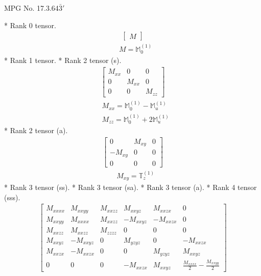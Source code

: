 \documentclass[fleqn,8pt,landscape]{jsarticle}
\begin{document}
\setcounter{MaxMatrixCols}{32}

\renewcommand{\tablename}{Table~}
\renewcommand{\figurename}{Figure~}
\begin{center}
\LARGE
MPG No. 17.3.64\quad$\bar{3}'$
\end{center}
* Rank 0 tensor.
\begin{align*}
\begin{bmatrix} M \end{bmatrix}
\end{align*}
\begin{align*}
& M = \mathbb{M}_{0}^{(1)}
\end{align*}
* Rank 1 tensor.
* Rank 2 tensor (s).
\begin{align*}
\begin{bmatrix} M_{xx} & 0 & 0 \\ 0 & M_{xx} & 0 \\ 0 & 0 & M_{zz} \end{bmatrix}
\end{align*}
\begin{align*}
& M_{xx} = \mathbb{M}_{0}^{(1)} - \mathbb{M}_{u}^{(1)} \\
& M_{zz} = \mathbb{M}_{0}^{(1)} + 2 \mathbb{M}_{u}^{(1)}
\end{align*}
* Rank 2 tensor (a).
\begin{align*}
\begin{bmatrix} 0 & M_{xy} & 0 \\ - M_{xy} & 0 & 0 \\ 0 & 0 & 0 \end{bmatrix}
\end{align*}
\begin{align*}
& M_{xy} = \mathbb{T}_{z}^{(1)}
\end{align*}
* Rank 3 tensor (ss).
* Rank 3 tensor (sa).
* Rank 3 tensor (a).
* Rank 4 tensor (sss).
\begin{align*}
\begin{bmatrix} M_{xxxx} & M_{xxyy} & M_{xxzz} & M_{xxyz} & M_{xxzx} & 0 \\ M_{xxyy} & M_{xxxx} & M_{xxzz} & - M_{xxyz} & - M_{xxzx} & 0 \\ M_{xxzz} & M_{xxzz} & M_{zzzz} & 0 & 0 & 0 \\ M_{xxyz} & - M_{xxyz} & 0 & M_{yzyz} & 0 & - M_{xxzx} \\ M_{xxzx} & - M_{xxzx} & 0 & 0 & M_{yzyz} & M_{xxyz} \\ 0 & 0 & 0 & - M_{xxzx} & M_{xxyz} & \frac{M_{xxxx}}{2} - \frac{M_{xxyy}}{2} \end{bmatrix}
\end{align*}
\end{document}
